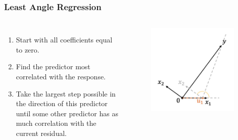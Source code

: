 \begin{frame}
\frametitle{Least Angle Regression}
\begin{columns}
    \begin{enumerate}
        \item Start with all coefficients equal to zero.
        \item Find the predictor most correlated with the response.
        \item Take the largest step possible in the direction of this predictor until some other predictor has as much correlation with the current residual.
    \end{enumerate}
    
    \begin{figure}[!htbp]
        \begin{center}
            \includegraphics[width=0.95\textwidth]{img/LAR/3.jpeg}
        \end{center}
    \end{figure}
\end{columns}
\end{frame}

